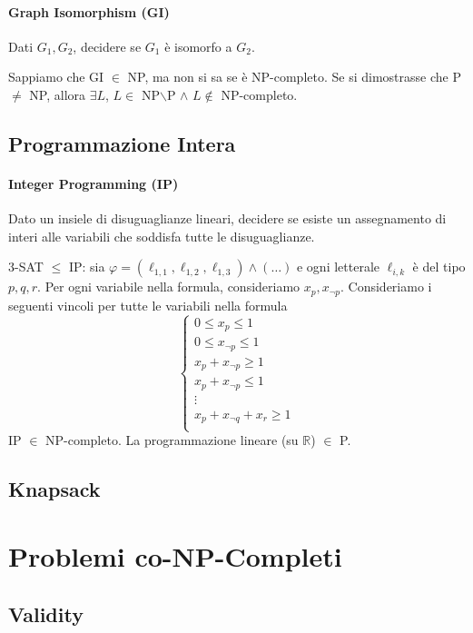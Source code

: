 \paragraph{Graph Isomorphism (GI)} Dati $G_1,G_2$, decidere se $G_1$ è isomorfo a $G_2$.\medskip

Sappiamo che GI $\in$ NP, ma non si sa se è NP-completo. Se si dimostrasse che P $\neq$ NP, allora $\exists L$, $L\in$ NP$\backslash$P $\land$ $L\not\in$ NP-completo.



\subsection{Programmazione Intera}
\paragraph{Integer Programming (IP)} Dato un insiele di disuguaglianze lineari, decidere se esiste un assegnamento di interi alle variabili che soddisfa tutte le disuguaglianze.\medskip

3-SAT $\leq$ IP: sia $\varphi=(\ell_{1,1},\ell_{1,2},\ell_{1,3})\land(\dots)$ e ogni letterale $\ell_{i,k}$ è del tipo $p,q,r$. Per ogni variabile nella formula, consideriamo $x_p,x_{\lnot p}$. Consideriamo i seguenti vincoli per tutte le variabili nella formula
$$
\begin{cases*}
    0\leq x_p\leq 1 \\
    0\leq x_{\lnot p}\leq 1 \\
    x_p+x_{\lnot p}\geq 1 \\
    x_p+x_{\lnot p}\leq 1 \\
    \vdots \\
    x_p+x_{\lnot q}+x_r\geq 1 \\
\end{cases*}
$$
IP $\in$ NP-completo. La programmazione lineare (su $\mathbb{R}$) $\in$ P.



\subsection{Knapsack}




\section{Problemi co-NP-Completi}


\subsection{Validity}





